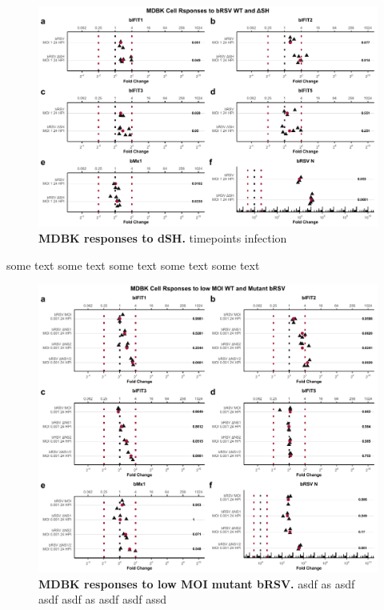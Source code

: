 \begin{figure}
    \centering
    \includegraphics[width=1\linewidth]{07. Chapter 2/Figs/02. Induction/05. mdbk_brsv_moi1_dsh.pdf}
    \caption[MDBK responses to dSH.]{\textbf{MDBK responses to dSH.} timepoints infection }
    \label{fig:MDBK responses to dSH}
\end{figure}

some text some text some text some text some text


\begin{figure}
    \centering
    \includegraphics[width=1\linewidth]{07. Chapter 2/Figs/02. Induction/06. mdbk_brsv_low_moi.pdf}
    \caption[MDBK responses to low MOI mutant bRSV.]{\textbf{MDBK responses to low MOI mutant bRSV.} asdf as asdf asdf asdf as asdf asdf assd }
    \label{fig:MDBK responses to low MOI mutant bRSV}
\end{figure}

